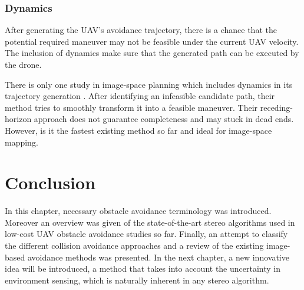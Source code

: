 \subsubsection{Dynamics}

After generating the UAV's avoidance trajectory, there is a chance that the potential required maneuver may not be feasible under the current UAV velocity. The inclusion of dynamics make sure that the generated path can be executed by the drone. 

There is only one study in image-space planning which includes dynamics in its trajectory generation \cite{Fragoso2017}. After identifying an infeasible candidate path, their method tries to smoothly transform it into a feasible maneuver. Their receding-horizon approach does not guarantee completeness and may stuck in dead ends. However, is it the fastest existing method so far and ideal for image-space mapping. 

\section{Conclusion}

In this chapter, necessary obstacle avoidance terminology was introduced. Moreover an overview was given of the state-of-the-art stereo algorithms used in low-cost UAV obstacle avoidance studies so far. Finally, an attempt to classify the different collision avoidance approaches and a review of the existing image-based avoidance methods was presented. In the next chapter, a new innovative idea will be introduced, a method that takes into account the uncertainty in environment sensing, which is naturally inherent in any stereo algorithm.


